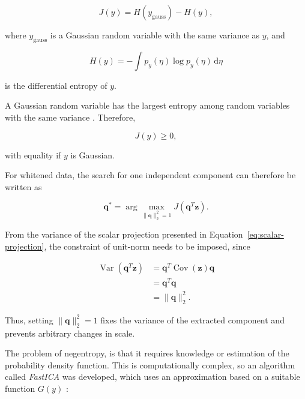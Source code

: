 \documentclass[english]{pwr_wmat_praca_dyplomowa}
\theoremstyle{definition}
\theoremstyle{remark}
\begin{document}
\begin{equation}
    J(y) = H(y_{\mathrm{gauss}}) - H(y),
\end{equation}

where $y_{\mathrm{gauss}}$ is a Gaussian random variable with the same variance as $y$, and

\begin{equation}
    H(y) = -\int p_y(\eta) \log p_y(\eta)\,\mathrm{d}\eta
\end{equation}

is the differential entropy of $y$.

A Gaussian random variable has the largest entropy among random variables with the same variance \cite[Section 5.3.2]{ica}. Therefore,

\begin{equation}
    J(y)\geq 0,
\end{equation}

with equality if $y$ is Gaussian.

For whitened data, the search for one independent component can therefore be written as

\begin{equation}
    \mathbf{q}^{\ast} = \arg\max_{\|\mathbf{q}\|_2^2=1} J \left(\mathbf{q}^T\mathbf{z}\right).
\end{equation}

\newpage
From the variance of the scalar projection presented in Equation~\eqref{eq:scalar-projection}, the constraint of unit-norm needs to be imposed, since

\begin{equation}
    \begin{aligned}
        \operatorname{Var}
        \left( \mathbf{q}^T\mathbf{z} \right)
        &= \mathbf{q}^T \operatorname{Cov}(\mathbf{z}) \mathbf{q} \\
        &= \mathbf{q}^T\mathbf{q} \\
        &= \|\mathbf{q}\|_2^2.
    \end{aligned}
\end{equation}

Thus, setting $\|\mathbf{q}\|_2^2=1$ fixes the variance of the extracted component and prevents arbitrary changes in scale.

The problem of negentropy, is that it requires knowledge or estimation of the probability density function. This is computationally complex, so an algorithm called \textit{FastICA} was developed, which uses an approximation based on a suitable function $G(y)$ \mbox{\cite[Equation 8.25]{ica}:}
\end{document}
